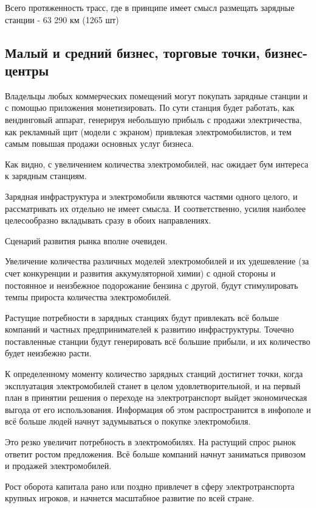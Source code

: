 \documentclass[a4paper,12pt]{report}
\begin{document}
Всего протяженность трасс, где в принципе имеет смысл размещать зарядные станции  - 63 290 км (1265 шт)

\subsection{Малый и средний бизнес, торговые точки, бизнес-центры}

Владельцы любых коммерческих помещений могут покупать зарядные станции и с помощью приложения монетизировать. По сути станция будет работать, как вендинговый аппарат, генерируя небольшую прибыль с продажи электричества, как рекламный щит (модели с экраном) привлекая электромобилистов, и тем самым повышая продажи основных услуг бизнеса. 

Как видно, с увеличением количества электромобилей, нас ожидает бум интереса к зарядным станциям. 

Зарядная инфраструктура и электромобили являются частями одного целого, и рассматривать их отдельно не имеет смысла. И соответственно, усилия наиболее целесообразно вкладывать сразу в обоих направлениях.  

Сценарий развития рынка вполне очевиден. 

Увеличение количества различных моделей электромобилей и их удешевление (за счет конкуренции и развития аккумуляторной химии) с одной стороны и постоянное и неизбежное подорожание бензина с другой, будут стимулировать темпы прироста количества электромобилей. 

Растущие потребности в зарядных станциях будут привлекать всё больше компаний и частных предпринимателей к развитию инфраструктуры. Точечно поставленные станции будут генерировать всё большие прибыли, и их количество будет неизбежно расти. 

К определенному моменту количество зарядных станций достигнет точки, когда эксплуатация электромобилей станет в целом удовлетворительной, и на первый план в принятии решения о переходе на электротранспорт выйдет экономическая выгода от его использования. Информация об этом распространится в инфополе и всё больше людей начнут задумываться о покупке электромобиля.

Это резко увеличит потребность в электромобилях. На растущий спрос рынок ответит ростом предложения. Всё больше компаний начнут заниматься привозом и продажей электромобилей. 

Рост оборота капитала рано или поздно привлечет в сферу электротранспорта крупных игроков, и начнется масштабное развитие по всей стране.
\end{document}

